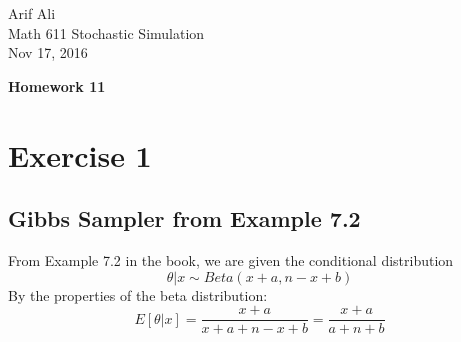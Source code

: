 \documentclass{article}\usepackage[]{graphicx}\usepackage[]{color}
\begin{document}
\begin{flushright}
Arif Ali\\
Math 611 Stochastic Simulation\\
Nov 17, 2016\\
\end{flushright}

\begin{center}
\LARGE\textbf{Homework 11}
  \end{center}
\section*{Exercise 1}
\subsection*{Gibbs Sampler from Example 7.2}
From Example 7.2 in the book, we are given the conditional distribution
\begin{equation}
\theta|x \sim Beta(x+a,n-x+b)
\end{equation}
By the properties of the beta distribution:
\begin{equation}
E[\theta|x]=\frac{x+a}{x+a+n-x+b}=\frac{x+a}{a+n+b}
\end{equation}
\end{document}
